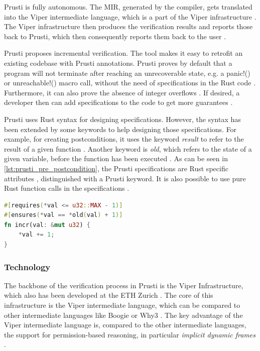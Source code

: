 Prusti is fully autonomous. The MIR, generated by the compiler, gets translated \cite{astrauskas_leveraging_2019} into the Viper intermediate language, which is a part of the Viper infrastructure \cite{jobstmann_viper_2016}. The Viper infrastructure then produces the verification results and reports those back to Prusti, which then consequently reports them back to the user \cite{astrauskas_leveraging_2019}.

Prusti proposes incremental verification. The tool makes it easy to retrofit an existing codebase with Prusti annotations. Prusti proves by default that a program will not terminate after reaching an unrecoverable state, e.g. a panic!() or unreachable!() macro call, without the need of specifications in the Rust code \cite{deshmukh_prusti_2022}. Furthermore, it can also prove the absence of integer overflows \cite{deshmukh_prusti_2022}. If desired, a developer then can add specifications to the code to get more guarantees \cite{deshmukh_prusti_2022}.

Prusti uses Rust syntax for designing specifications. However, the syntax has been extended by some keywords to help designing those specifications. For example, for creating postconditions, it uses the keyword \textit{result} to refer to the result of a given function \cite{deshmukh_prusti_2022}. Another keyword is \textit{old}, which refers to the state of a given variable, before the function has been executed \cite{deshmukh_prusti_2022}. As can be seen in \autoref{lst:prusti_pre_postcondition}, the Prusti specifications are Rust specific attributes \cite{rust_foundation_attributes_nodate}, distinguished with a Prusti keyword. It is also possible to use pure Rust function calls in the specifications \cite{deshmukh_prusti_2022}. 

\begin{lstlisting}[language=Rust, caption=Example Rust code of a function with a pre- and postcondition for Prusti, label={lst:prusti_pre_postcondition}]
#[requires(*val <= u32::MAX - 1)]
#[ensures(*val == *old(val) + 1)]
fn incr(val: &mut u32) {
    *val += 1;
}
\end{lstlisting}

\subsubsection{Technology}
The backbone of the verification process in Prusti is the Viper Infrastructure, which also has been developed at the ETH Zurich \cite{jobstmann_viper_2016}. The core of this infrastructure is the Viper intermediate language, which can be compared to other intermediate languages like Boogie or Why3 \cite{jobstmann_viper_2016}. The key advantage of the Viper intermediate language is, compared to the other intermediate languages, the support for permission-based reasoning, in particular \textit{implicit dynamic frames} \cite{deshmukh_prusti_2022, astrauskas_leveraging_2019, jobstmann_viper_2016}.

